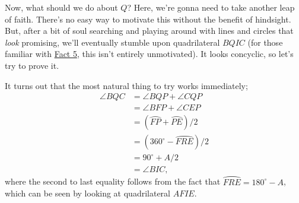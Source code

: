 Now, what should we do about $Q$? Here, we're gonna need to take another leap of faith. There's no easy way to motivate this without the benefit of hindsight. But, after a bit of soul searching and playing around with lines and circles that \textit{look} promising, we'll eventually stumble upon quadrilateral $BQIC$ (for those familiar with \href{https://web.evanchen.cc/handouts/Fact5/Fact5.pdf}{Fact 5}, this isn't entirely unmotivated). It looks concyclic, so let's try to prove it.\V

It turns out that the most natural thing to try works immediately; 
\begin{align*}
    \angle{BQC} &= \angle{BQP} + \angle{CQP} \\
    &= \angle{BFP} + \angle{CEP}\\
    &= (\wideparen{FP}+\wideparen{PE})/2\\
    &= (360^{\circ} - \wideparen{FRE})/2 \\
    &= 90^{\circ} + A/2\\
    &= \angle{BIC},
\end{align*}
where the second to last equality follows from the fact that $\wideparen{FRE} = 180^{\circ}-A$, which can be seen by looking at quadrilateral $AFIE$. \newpage

